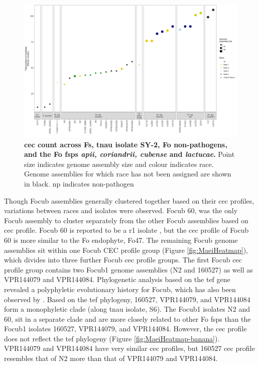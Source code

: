 \begin{figure}[ht!]
    \centering
    \includegraphics[width=\textwidth]{Figures/CecDistribinFspOfInterest.png}
    \captionsetup{width=\textwidth}
    \caption[\Acl{cec} count across \acl{Fs}, \ac{tnau} isolate SY-2, \acl{Fo} non-pathogens, and the \ac{Fo} \acp{fsp} \textit{apii, coriandrii, cubense} and \textit{lactucae}..]{\textbf{\Acf{cec} count across \acl{Fs}, \ac{tnau} isolate SY-2, \acf{Fo} non-pathogens, and the \ac{Fo} \acp{fsp} \textit{apii, coriandrii, cubense} and \textit{lactucae}.} Point size indicates genome assembly size and colour indicates race. Genome assemblies for which race has not been assigned are shown in black. np indicates non-pathogen}
    \label{fig:CECcount}
\end{figure}

Though \ac{Focub} assemblies generally clustered together based on their \ac{cec} profiles, variations between races and isolates were observed. \ac{Focub} 60, was the only \ac{Focub} assembly to cluster separately from the other \ac{Focub} assemblies based on \ac{cec} profile. \ac{Focub} 60 is reported to be a \ac{r1} isolate \parencite{Yun2019}, but the \ac{cec} profile of \ac{Focub} 60 is more similar to the \ac{Fo} endophyte, Fo47. The remaining \ac{Focub} genome assemblies sit within one \ac{Focub} \ac{CEC} profile group (Figure \ref{fig:MaeiHeatmap}), which divides into three further \ac{Focub} \ac{cec} profile groups. The first \ac{Focub} \ac{cec} profile group contains two \ac{Focub1} genome assemblies (N2 and 160527) as well as VPR144079 and VPR144084. Phylogenetic analysis based on the \ac{tef} gene revealed a polyphyletic evolutionary history for \ac{Focub}, which has also been observed by \textcite{Maryani2019, Mostert2022}. Based on the \ac{tef} phylogeny, 160527, VPR144079, and VPR144084 form a monophyletic clade (along \ac{tnau} isolate, S6). The \ac{Focub1} isolates N2 and 60, sit in a separate clade and are more closely related to other \ac{Fo} \acp{fsp} than the \ac{Focub1} isolates 160527, VPR144079, and VPR144084. However, the \ac{cec} profile does not reflect the \ac{tef} phylogeny (Figure \ref{fig:MaeiHeatmap-banana}). VPR144079 and VPR144084 have very similar \ac{cec} profiles, but 160527 \ac{cec} profile resembles that of N2 more than that of VPR144079 and VPR144084. 

